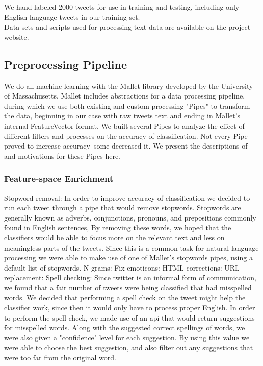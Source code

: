 \documentclass[letterpaper]{article}
\begin{document}
We hand labeled 2000 tweets for use in training and testing, including only English-language tweets in our training set. \\
Data sets and scripts used for processing text data are available on the project website.\\

\subsection{Preprocessing Pipeline}

We do all machine learning with the Mallet\cite{McCallumMALLET} library developed by the University of Massachusetts. Mallet includes abstractions for a data processing pipeline, during which we use both existing and custom processing "Pipes" to transform the data, beginning in our case with raw tweets text and ending in Mallet's internal FeatureVector format. We built several Pipes to analyze the effect of different filters and processes on the accuracy of classification. Not every Pipe proved to increase accuracy--some decreased it. We present the descriptions of and motivations for these Pipes here.

\subsubsection{Feature-space Enrichment}
Stopword removal: In order to improve accuracy of classification we decided to run each tweet through a pipe that would remove stopwords. Stopwords are generally known as adverbs, conjunctions, pronouns, and prepositions commonly found in English sentences, By removing these words, we hoped that the classifiers would be able to focus more on the relevant text and less on meaningless parts of the tweets. Since this is a common task for natural language processing we were able to make use of one of Mallet's stopwords pipes, using a default list of stopwords.
N-grams:
Fix emoticons:
HTML corrections: 
URL replacement:
Spell checking: Since twitter is an informal form of communication, we found that a fair number of tweets were being classified that had misspelled words. We decided that performing a spell check on the tweet might help the classifier work, since then it would only have to process proper English. In order to perform the spell check, we made use of an api that would return suggestions for misspelled words. Along with the suggested correct spellings of words, we were also given a "confidence" level for each suggestion. By using this value we were able to choose the best suggestion, and also filter out any suggestions that were too far from the original word.
\end{document}
